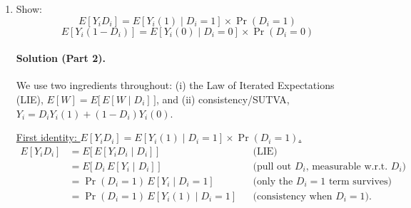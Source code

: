 \documentclass[12pt]{article}
\begin{document}
\begin{enumerate}[label=\arabic*.]
\noindent\textbf{Derivation.} Using linearity of expectation,
\[
\text{ATT}
= E\!\big[Y_i(1)-Y_i(0)\,\big|\,D_i=1\big]
= E\!\big[Y_i(1)\,\big|\,D_i=1\big] - E\!\big[Y_i(0)\,\big|\,D_i=1\big].
\]
By random assignment (A1),
\[
E\!\big[Y_i(1)\,\big|\,D_i=1\big] = E\!\big[Y_i(1)\big],
\qquad
E\!\big[Y_i(0)\,\big|\,D_i=1\big] = E\!\big[Y_i(0)\big].
\]
Therefore,
\[
\text{ATT}
= E\!\big[Y_i(1)\big] - E\!\big[Y_i(0)\big]
= E\!\big[Y_i(1)-Y_i(0)\big]
= \text{ATE}.
\]

\noindent\textbf{Interpretation (ATE vs.\ ATT).} 
\begin{itemize}[leftmargin=1.5em]
  \item \(\text{ATE}=E[Y_i(1)-Y_i(0)]\) is the average causal effect in the full population.
  \item \(\text{ATT}=E[Y_i(1)-Y_i(0)\mid D_i=1]\) is the average causal effect among those assigned to treatment.
\end{itemize}
Under random assignment, treated and untreated groups are (in distribution) the same ex ante, so the average effect among the treated equals the population average effect: \(\text{ATT}=\text{ATE}\). Without random assignment, these generally differ because \(D_i\) may be related to \((Y_i(1),Y_i(0))\) (selection).

  \item Show:
  \[
  E[Y_i D_i] = E[Y_i(1) \mid D_i = 1] \times \Pr(D_i = 1)
  \]
  \[
  E[Y_i (1 - D_i)] = E[Y_i(0) \mid D_i = 0] \times \Pr(D_i = 0)
  \]


\paragraph{Solution (Part 2).}
We use two ingredients throughout: (i) the Law of Iterated Expectations (LIE),
\(E[W]=E\!\big[\,E[W\mid D_i]\,\big]\), and (ii) consistency/SUTVA,
\(Y_i=D_iY_i(1)+(1-D_i)Y_i(0)\).

\medskip
\noindent\underline{First identity: \(E[Y_i D_i] = E[Y_i(1)\mid D_i=1]\times \Pr(D_i=1)\).}
\[
\begin{aligned}
E[Y_i D_i]
&= E\!\big[\,E[Y_i D_i \mid D_i]\,\big] &&\text{(LIE)} \\
&= E\!\big[\,D_i\,E[Y_i \mid D_i]\,\big] &&\text{(pull out }D_i\text{, measurable w.r.t.\ }D_i\text{)}\\
&= \Pr(D_i=1)\,E[Y_i \mid D_i=1] &&\text{(only the }D_i=1\text{ term survives)}\\
&= \Pr(D_i=1)\,E[Y_i(1) \mid D_i=1] &&\text{(consistency when }D_i=1\text{)}.
\end{aligned}
\]


\end{enumerate}
\end{document}

